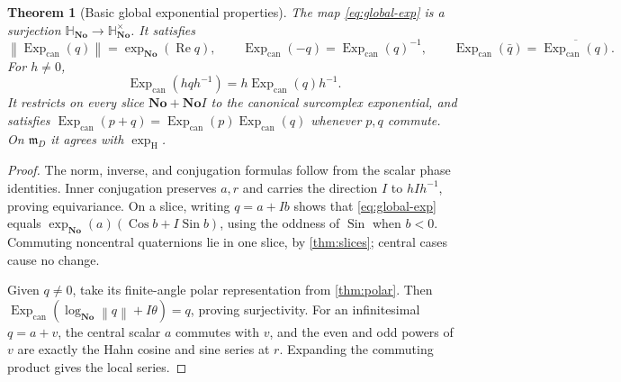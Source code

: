 \documentclass[11pt,letterpaper]{article}
\newtheorem{theorem}{Theorem}[section]
\theoremstyle{definition}
\newcommand{\No}{\mathbf{No}}
\newcommand{\SQ}{\mathbb H_{\No}}
\newcommand{\mm}{\mathfrak m}
\newcommand{\norm}[1]{\left\lVert#1\right\rVert}
\DeclareMathOperator{\Rea}{Re}
\DeclareMathOperator{\Sin}{Sin}
\DeclareMathOperator{\Cos}{Cos}
\newcommand{\ExpC}{\operatorname{Exp}_{\mathrm{can}}}
\newcommand{\exph}{\operatorname{exp}_{\mathrm H}}
\begin{document}
\begin{theorem}[Basic global exponential properties]
\label{thm:globalexp}
The map \eqref{eq:global-exp} is a surjection $\SQ\to\SQ^\times$. It satisfies
\[
 \norm{\ExpC(q)}=\exp_{\No}(\Rea q),\qquad
 \ExpC(-q)=\ExpC(q)^{-1},\qquad
 \ExpC(\bar q)=\overline{\ExpC(q)}.
\]
For $h\ne0$,
\[
 \ExpC(hqh^{-1})=h\ExpC(q)h^{-1}.
\]
It restricts on every slice $\No+\No I$ to the canonical surcomplex
exponential, and satisfies $\ExpC(p+q)=\ExpC(p)\ExpC(q)$ whenever $p,q$ commute.
On $\mm_D$ it agrees with $\exph$.
\end{theorem}
\begin{proof}
The norm, inverse, and conjugation formulas follow from the scalar phase
identities. Inner conjugation preserves $a,r$ and carries the direction $I$ to
$hIh^{-1}$, proving equivariance. On a slice, writing $q=a+Ib$ shows that
\eqref{eq:global-exp} equals $\exp_{\No}(a)(\Cos b+I\Sin b)$, using the oddness of
$\Sin$ when $b<0$. Commuting noncentral quaternions lie in one slice, by
\cref{thm:slices}; central cases cause no change.

Given $q\ne0$, take its finite-angle polar representation from
\cref{thm:polar}. Then
$\ExpC(\log_{\No}\norm q+I\theta)=q$, proving surjectivity. For an infinitesimal
$q=a+v$, the central scalar $a$ commutes with $v$, and the even and odd powers
of $v$ are exactly the Hahn cosine and sine series at $r$. Expanding the
commuting product gives the local series.
\end{proof}
\end{document}
